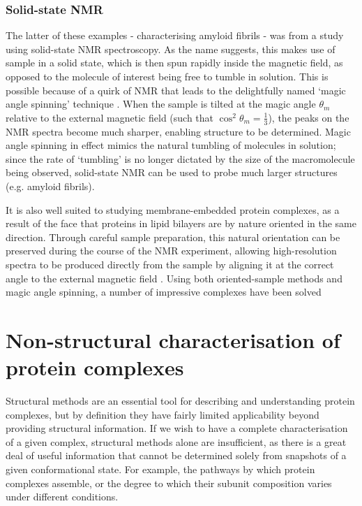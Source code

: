 \documentclass[a4paper,11pt,twoside,openright]{scrbook}
\begin{document}
\subsubsection{Solid-state NMR}
The latter of these examples - characterising amyloid fibrils - was from a study using solid-state NMR spectroscopy. As the name suggests, this makes use of sample in a solid state, which is then spun rapidly inside the magnetic field, as opposed to the molecule of interest being free to tumble in solution. This is possible because of a quirk of NMR that leads to the delightfully named `magic angle spinning' technique \cite{Andrew1958,Lowe1959}. When the sample is tilted at the magic angle $\theta_{m}$ relative to the external magnetic field (such that $\cos^{2}\theta_{m} = \frac{1}{3}$), the peaks on the NMR spectra become much sharper, enabling structure to be determined. Magic angle spinning in effect mimics the natural tumbling of molecules in solution; since the rate of `tumbling' is no longer dictated by the size of the macromolecule being observed, solid-state NMR can be used to probe much larger structures (e.g. amyloid fibrils).

It is also well suited to studying membrane-embedded protein complexes, as a result of the face that proteins in lipid bilayers are by nature oriented in the same direction. Through careful sample preparation, this natural orientation can be preserved during the course of the NMR experiment, allowing high-resolution spectra to be produced directly from the sample by aligning it at the correct angle to the external magnetic field \cite{Hansen2015}. Using both oriented-sample methods and magic angle spinning, a number of impressive complexes have been solved \cite{Loquet2012,Kaplan2015,Huang2017}

\section{Non-structural characterisation of protein complexes}
Structural methods are an essential tool for describing and understanding protein complexes, but by definition they have fairly limited applicability beyond providing structural information. If we wish to have a complete characterisation of a given complex, structural methods alone are insufficient, as there is a great deal of useful information that cannot be determined solely from snapshots of a given conformational state. For example, the pathways by which protein complexes assemble, or the degree to which their subunit composition varies under different conditions.
\end{document}
